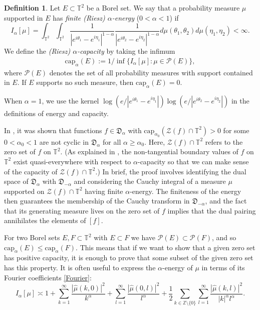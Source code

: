 \documentclass[11 pt,reqno]{amsart}
\theoremstyle{definition}
\newtheorem{defn}[thm]{Definition}
\theoremstyle{remark}
\numberwithin{equation}{section} \numberwithin{figure}{section}
\begin{document}
\begin{defn}
Let $E\subset \mathbb{T}^2$ be a Borel set. We say that a probability
measure $\mu$ supported in $E$ has {\it finite (Riesz) $\alpha$-energy} ($0<\alpha<1$) if
\begin{equation*}
I_{\alpha}[\mu]=\int_{\mathbb{T}^2}\int_{\mathbb{T}^2}\frac{1}{|e^{i\theta_1}-e^{i\eta_1}|^{1-\alpha}}\frac{1}{|e^{i\theta_2}-e^{i\eta_2}|^{1-\alpha}}d\mu(\theta_1,\theta_2)d\mu(\eta_1,\eta_2)<\infty.
\label{logenergy}
\end{equation*}
We define the \emph{(Riesz) $\alpha$-capacity} by taking the infimum
\begin{align*}
{\text{cap}_\alpha}(E):= 1/\inf\{I_{\alpha}[\mu]: \mu\in \mathcal{P}(E)\},
\end{align*}
where $\mathcal{P}(E)$ denotes the set of all probability measures with support contained in $E$.
If $E$ supports no such measure, then ${\text{cap}_\alpha}(E)=0$.

When $\alpha=1$, we use the kernel $\log(e/|e^{i\theta_1}-e^{i\eta_1}|)\log(e/|e^{i\theta_2}-e^{i\eta_2}|)$
in the definitions of energy and capacity.
\end{defn}
In \cite[Section 4]{BCLSS13II}, it was shown that functions
$f\in\mathfrak{D}_\alpha$ with
$\mathrm{cap}_{\alpha_0}(\mathcal{Z}(f)\cap {{\mathbb T}}^2)>0$ for some
$0<\alpha_0<1$ are not cyclic in $\mathfrak{D}_\alpha$ for all
$\alpha\ge \alpha_0$.  Here, $\mathcal{Z}(f)\cap{{\mathbb T}}^2$ refers to the
zero set of $f$ on ${{\mathbb T}}^2$.  (As explained in \cite{BCLSS13II}, the
non-tangential boundary values of $f$ on ${{\mathbb T}}^2$ exist
quasi-everywhere with respect to ${\alpha}$-capacity so that we can make
sense of the capacity of $\mathcal{Z}(f)\cap{{\mathbb T}}^2$.)  In brief, the
proof involves identifying the dual space of $\mathfrak{D}_{\alpha}$
with $\mathfrak{D}_{-\alpha}$ and considering the Cauchy integral of a
measure $\mu$ supported on $\mathcal{Z}(f)\cap {{\mathbb T}}^2$ having finite
$\alpha$-energy.  The finiteness of the energy then guarantees the
membership of the Cauchy transform in $\mathfrak{D}_{-\alpha}$, and
the fact that its generating measure lives on the zero set of $f$
implies that the dual pairing annihilates the elements of $[f]$.

For two Borel sets $E, F\subset \mathbb{T}^2$ with $E\subset F$ we have $\mathcal{P}(E)\subset \mathcal{P}(F)$, and so ${\text{cap}_\alpha}(E)\le{\text{cap}_\alpha}(F)$. This means that if we want to show that a given zero set has positive capacity, it is enough to prove that some subset of the given zero set has this property. It is often useful to express the $\alpha$-energy of $\mu$ in terms of its Fourier coefficients \eqref{Fourier}:
\begin{equation}
I_{\alpha}[\mu]\asymp 1+\sum_{k=1}^{\infty}\frac{|\hat{\mu}(k,0)|^2}{k^{\alpha}}
+\sum_{l=1}^{\infty}\frac{|\hat{\mu}(0,l)|^2}{l^{\alpha}}+\frac{1}{2}\sum_{k \in \mathbb{Z}\setminus \{0\}}
\sum_{l=1}^{\infty}\frac{|\hat{\mu}(k,l)|^2}{|k|^{\alpha} l^{\alpha}}.
\label{logenergycoeffs}
\end{equation}
\end{document}
